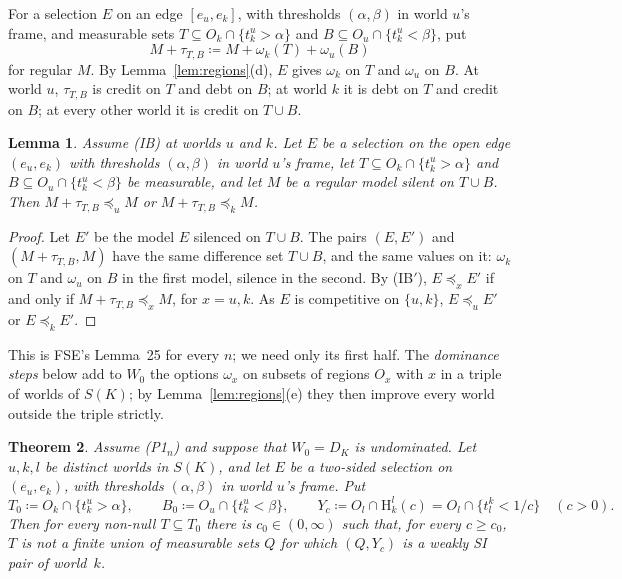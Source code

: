 \documentclass[11pt]{article}
\newtheorem{theorem}{Theorem}
\newtheorem{lemma}[theorem]{Lemma}
\theoremstyle{definition}\newtheorem{definition}[theorem]{Definition}
\theoremstyle{remark}\newtheorem{remark}[theorem]{Remark}
\newcommand{\Hi}[3]{\mathrm H^{#1}_{#2}(#3)}
\begin{document}
For a selection $E$ on an edge $[e_u,e_k]$, with thresholds $(\alpha,\beta)$
in world $u$'s frame, and measurable sets $T\subseteq O_k\cap
\{t^u_k>\alpha\}$ and $B\subseteq O_u\cap\{t^u_k<\beta\}$, put
\[
 M+\tau_{T,B}\coloneqq M+\omega_k(T)+\omega_u(B)
\]
for regular $M$. By Lemma~\ref{lem:regions}(d), $E$ gives $\omega_k$ on
$T$ and $\omega_u$ on $B$. At world $u$, $\tau_{T,B}$ is credit on $T$ and
debt on $B$; at world $k$ it is debt on $T$ and credit on $B$; at every
other world it is credit on $T\cup B$.

\begin{lemma}\label{lem:XOR}
Assume (IB) at worlds $u$ and $k$. Let $E$ be a selection on the open edge
$(e_u,e_k)$ with thresholds $(\alpha,\beta)$ in world $u$'s frame, let
$T\subseteq O_k\cap\{t^u_k>\alpha\}$ and $B\subseteq O_u\cap\{t^u_k<\beta\}$
be measurable, and let $M$ be a regular model silent on $T\cup B$. Then
$M+\tau_{T,B}\preceq_uM$ or $M+\tau_{T,B}\preceq_kM$.
\end{lemma}
\begin{proof}
Let $E'$ be the model $E$ silenced on $T\cup B$. The pairs $(E,E')$ and
$(M+\tau_{T,B},M)$ have the same difference set $T\cup B$, and the same
values on it: $\omega_k$ on $T$ and $\omega_u$ on $B$ in the first model,
silence in the second. By (IB$'$), $E\preceq_xE'$ if and only if
$M+\tau_{T,B}\preceq_xM$, for $x=u,k$. As $E$ is competitive on $\{u,k\}$,
$E\preceq_uE'$ or $E\preceq_kE'$.
\end{proof}

This is FSE's Lemma~25 for every $n$; we need only its first half. The
\emph{dominance steps} below add to $W_0$ the options $\omega_x$ on subsets
of regions $O_x$ with $x$ in a triple of worlds of $S(K)$; by
Lemma~\ref{lem:regions}(e) they then improve every world outside the triple
strictly.

\begin{theorem}\label{thm:own}
Assume (P1$_n$) and suppose that $W_0=D_K$ is undominated. Let $u,k,l$ be
distinct worlds in $S(K)$, and let $E$ be a two-sided selection on
$(e_u,e_k)$, with thresholds $(\alpha,\beta)$ in world $u$'s frame. Put
\[
 T_0\coloneqq O_k\cap\{t^u_k>\alpha\},\qquad
 B_0\coloneqq O_u\cap\{t^u_k<\beta\},\qquad
 Y_c\coloneqq O_l\cap\Hi lkc=O_l\cap\{t^k_l<1/c\}\quad(c>0).
\]
Then for every non-null $T\subseteq T_0$ there is $c_0\in(0,\infty)$ such
that, for every $c\ge c_0$, $T$ is not a finite union of measurable sets $Q$
for which $(Q,Y_c)$ is a weakly SI pair of world~$k$.
\end{theorem}
\end{document}
